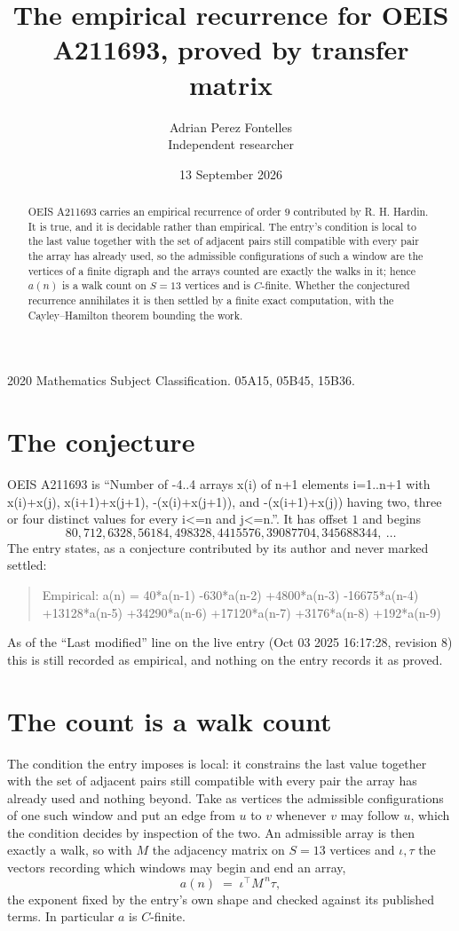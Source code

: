 \documentclass[11pt,a4paper]{article}
\title{The empirical recurrence for OEIS A211693, proved by transfer matrix}
\author{Adrian Perez Fontelles\\ \small Independent researcher}
\date{13 September 2026}
\theoremstyle{plain}
\theoremstyle{definition}
\begin{document}
\maketitle

\begin{abstract}
OEIS A211693 carries an empirical recurrence of order $9$ contributed by R. H. Hardin. It is
true, and it is decidable rather than empirical. The entry's condition is local to the last value together with the set of adjacent pairs still compatible with every pair the array has already used, so
the admissible configurations of such a window are the vertices of a finite digraph and the
arrays counted are exactly the walks in it; hence $a(n)$ is a walk count on $S=13$ vertices
and is $C$-finite. Whether the conjectured recurrence annihilates it is then settled by a
finite exact computation, with the Cayley--Hamilton theorem bounding the work.
\end{abstract}

\noindent\small 2020 Mathematics Subject Classification. 05A15, 05B45, 15B36.\normalsize

\section{The conjecture}

OEIS A211693 is ``Number of -4..4 arrays x(i) of n+1 elements i=1..n+1 with x(i)+x(j), x(i+1)+x(j+1), -(x(i)+x(j+1)), and -(x(i+1)+x(j)) having two, three or four distinct values for every i<=n and j<=n.''. It has offset $1$ and begins
\[
80, 712, 6328, 56184, 498328, 4415576, 39087704, 345688344,\ \dots
\]
The entry states, as a conjecture contributed by its author and never marked settled:
\begin{quote}
Empirical: a(n) = 40*a(n-1) -630*a(n-2) +4800*a(n-3) -16675*a(n-4) +13128*a(n-5) +34290*a(n-6) +17120*a(n-7) +3176*a(n-8) +192*a(n-9)
\end{quote}
As of the ``Last modified'' line on the live entry (Oct 03 2025 16:17:28, revision 8) this is still
recorded as empirical, and nothing on the entry records it as proved.

\section{The count is a walk count}

The condition the entry imposes is local: it constrains the last value together with the set of adjacent pairs still compatible with every pair the array has already used and nothing beyond. Take as
vertices the admissible configurations of one such window and put an edge from $u$ to $v$
whenever $v$ may follow $u$, which the condition decides by inspection of the two. An
admissible array is then exactly a walk, so with $M$ the adjacency matrix on $S=13$ vertices
and $\iota,\tau$ the vectors recording which windows may begin and end an array,
\[
a(n)\;=\;\iota^{\!\top}M^{\,n}\tau ,
\]
the exponent fixed by the entry's own shape and checked against its published terms. In
particular $a$ is $C$-finite.
\end{document}
